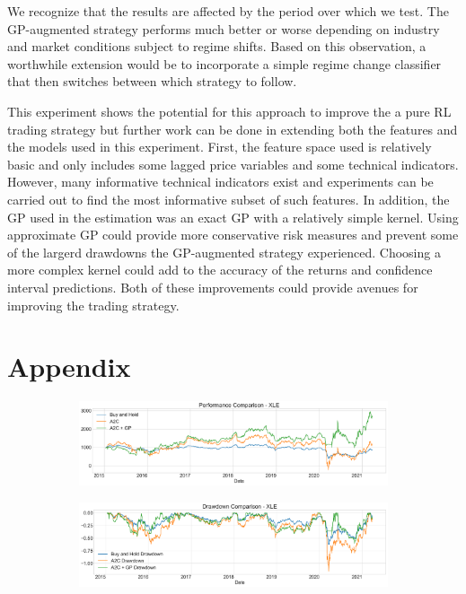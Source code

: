 \documentclass[12pt]{article}
\begin{document}
We recognize that the results are affected by the period over which we test. The GP-augmented strategy performs much better or worse depending on industry and market conditions subject to regime shifts. Based on this observation, a worthwhile extension would be to incorporate a simple regime change classifier that then switches between which strategy to follow.

This experiment shows the potential for this approach to improve the a pure RL trading strategy but further work can be done in extending both the features and the models used in this experiment. First, the feature space used is relatively basic and only includes some lagged price variables and some technical indicators. However, many informative technical indicators exist and experiments can be carried out to find the most informative subset of such features. In addition, the GP used in the estimation was an exact GP with a relatively simple kernel. Using approximate GP could provide more conservative risk measures and prevent some of the largerd drawdowns the GP-augmented strategy experienced. Choosing a more complex kernel could add to the accuracy of the returns and confidence interval predictions. Both of these improvements could provide avenues for improving the trading strategy.

\newpage


\newpage
\section{Appendix}

\begin{figure}[h]
	\centering
	\begin{subfigure}{\linewidth}
		\centering
		\includegraphics[width=\linewidth]{../src/figures/xle_performance_comparison.pdf}
	\end{subfigure}
	\begin{subfigure}{\linewidth}
		\centering
		\includegraphics[width=\linewidth]{../src/figures/xle_drawdowns_comparison.pdf}
	\end{subfigure}
	\caption{}
	\label{fig:xle}
\end{figure}
\end{document}
